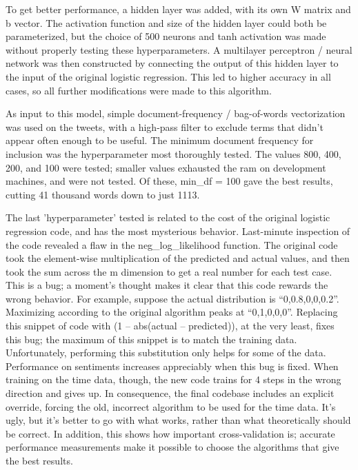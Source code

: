 \documentclass{article}
\begin{document}
To get better performance, a hidden layer was added, with its own W matrix and b vector. The activation function and size of the hidden layer could both be parameterized, but the choice of 500 neurons and tanh activation was made without properly testing these hyperparameters. A multilayer perceptron / neural network was then constructed by connecting the output of this hidden layer to the input of the original logistic regression. This led to higher accuracy in all cases, so all further modifications were made to this algorithm.

As input to this model, simple document-frequency / bag-of-words vectorization was used on the tweets, with a high-pass filter to exclude terms that didn't appear often enough to be useful. The minimum document frequency for inclusion was the hyperparameter most thoroughly tested. The values 800, 400, 200, and 100 were tested; smaller values exhausted the ram on development machines, and were not tested. Of these, min\_df = 100 gave the best results, cutting 41 thousand words down to just 1113.

The last 'hyperparameter' tested is related to the cost of the original logistic regression code, and has the most mysterious behavior. Last-minute inspection of the code revealed a flaw in the neg\_log\_likelihood function. The original code took the element-wise multiplication of the predicted and actual values, and then took the sum across the m dimension to get a real number for each test case. This is a bug; a moment's thought makes it clear that this code rewards the wrong behavior. For example, suppose the actual distribution is “0,0.8,0,0,0.2”. Maximizing according to the original algorithm peaks at “0,1,0,0,0”. Replacing this snippet of code with (1 – abs(actual – predicted)), at the very least, fixes this bug; the maximum of this snippet is to match the training data. Unfortunately, performing this substitution only helps for some of the data. Performance on sentiments increases appreciably when this bug is fixed. When training on the time data, though, the new code trains for 4 steps in the wrong direction and gives up. In consequence, the final codebase includes an explicit override, forcing the old, incorrect algorithm to be used for the time data. It's ugly, but it's better to go with what works, rather than what theoretically should be correct. In addition, this shows how important cross-validation is; accurate performance measurements make it possible to choose the algorithms that give the best results.
\end{document}
